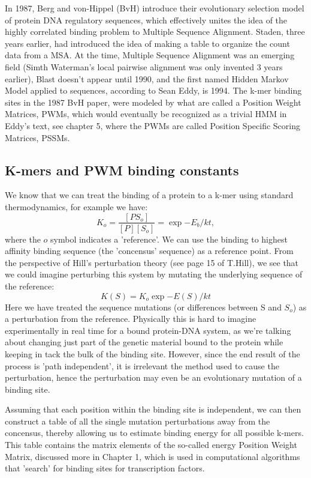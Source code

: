 In 1987, Berg and von-Hippel (BvH) introduce their evolutionary selection model of protein DNA regulatory sequences, which effectively unites the idea of the highly correlated binding problem to Multiple Sequence Alignment.  Staden, three years earlier, had introduced the idea of making a table to organize the count data from a MSA.  At the time, Multiple Sequence Alignment was an emerging field (Simth Waterman's local pairwise alignment was only invented 3 years earlier), Blast doesn't appear until 1990, and the first named Hidden Markov Model applied to sequences, according to Sean Eddy, is 1994.  The k-mer binding sites in the 1987 BvH paper, were modeled by what are called a Position Weight Matrices, PWMs, which would eventually be recognized as a trivial HMM in Eddy's text, see chapter 5, where the PWMs are called Position Specific Scoring Matrices, PSSMs.



\subsection{K-mers and PWM binding constants}
We know that we can treat the binding of a protein to a k-mer using standard thermodynamics, for example we have:
\begin{equation}\label{}
  K_o = \frac{[PS_o]}{[P][S_o]} = \exp{-E_b/kt},
\end{equation}
where the $o$ symbol indicates a 'reference'.  We can use the binding to highest affinity binding sequence (the 'concensus' sequence) as a reference point.  From the perspective of Hill's perturbation theory (see page 15 of T.Hill\cite{hill}), we see that we could imagine perturbing this system by mutating the underlying sequence of the reference:
\begin{equation}\label{}
  K(S) =K_o\exp{-E(S)/kt}
\end{equation}
Here we have treated the sequence mutations (or differences between S and $S_o$) as a perturbation from the reference.  Physically this is hard to imagine experimentally in real time for a bound protein-DNA system, as we're talking about changing just part of the genetic material bound to the protein while keeping in tack the bulk of the binding site.  However, since the end result of the process is 'path independent', it is irrelevant the method used to cause the perturbation, hence the perturbation may even be an evolutionary mutation of a binding site.

Assuming that each position within the binding site is independent, we can then construct a table of all the single mutation perturbations away from the concensus, thereby allowing us to estimate binding energy for all possible k-mers.  This table contains the matrix elements of the so-called energy Position Weight Matrix, discussed more in Chapter 1, which is used in computational algorithms that 'search' for binding sites for transcription factors.
